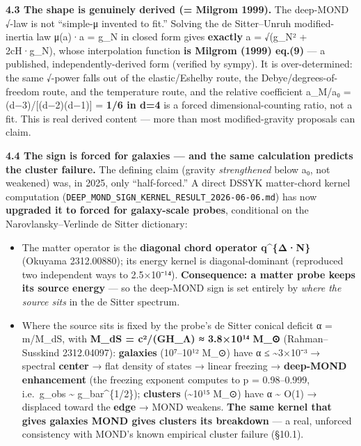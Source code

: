 \documentclass[
]{article}
\providecommand{\tightlist}{%
  \setlength{\itemsep}{0pt}\setlength{\parskip}{0pt}}
\begin{document}
\textbf{4.3 The shape is genuinely derived (= Milgrom 1999).} The
deep-MOND √-law is not ``simple-μ invented to fit.'' Solving the de
Sitter--Unruh modified-inertia law μ(a)·a = g\_N in closed form gives
\textbf{exactly} a = √(g\_N² + 2cH·g\_N), whose interpolation function
\textbf{is Milgrom (1999) eq.(9)} --- a published, independently-derived
form (verified by sympy). It is over-determined: the same √-power falls
out of the elastic/Eshelby route, the Debye/degrees-of-freedom route,
and the temperature route, and the relative coefficient a\_M/a₀ =
(d−3)/{[}(d−2)(d−1){]} = \textbf{1/6 in d=4} is a forced
dimensional-counting ratio, not a fit. This is real derived content ---
more than most modified-gravity proposals can claim.

\textbf{4.4 The sign is forced for galaxies --- and the same calculation
predicts the cluster failure.} The defining claim (gravity
\emph{strengthened} below a₀, not weakened) was, in 2025, only
``half-forced.'' A direct DSSYK matter-chord kernel computation
(\texttt{DEEP\_MOND\_SIGN\_KERNEL\_RESULT\_2026-06-06.md}) has now
\textbf{upgraded it to forced for galaxy-scale probes}, conditional on
the Narovlansky--Verlinde de Sitter dictionary:

\begin{itemize}
\tightlist
\item
  The matter operator is the \textbf{diagonal chord operator
  q\^{}\{Δ·N\}} (Okuyama 2312.00880); its energy kernel is
  diagonal-dominant (reproduced two independent ways to 2.5×10⁻¹⁴).
  \textbf{Consequence: a matter probe keeps its source energy} --- so
  the deep-MOND sign is set entirely by \emph{where the source sits} in
  the de Sitter spectrum.
\item
  Where the source sits is fixed by the probe's de Sitter conical
  deficit α = m/M\_dS, with \textbf{M\_dS = c²/(GH\_Λ) ≈ 3.8×10¹⁴ M\_⊙}
  (Rahman--Susskind 2312.04097): \textbf{galaxies} (10⁷--10¹² M\_⊙) have
  α ≤ \textasciitilde3×10⁻³ → spectral \textbf{center} → flat density of
  states → linear freezing → \textbf{deep-MOND enhancement} (the
  freezing exponent computes to p = 0.98--0.999, i.e.~g\_obs
  \textasciitilde{} g\_bar\^{}\{1/2\}); \textbf{clusters}
  (\textasciitilde10¹⁵ M\_⊙) have α \textasciitilde{} O(1) → displaced
  toward the \textbf{edge} → MOND weakens. \textbf{The same kernel that
  gives galaxies MOND gives clusters its breakdown} --- a real, unforced
  consistency with MOND's known empirical cluster failure (§10.1).
\end{itemize}
\end{document}
